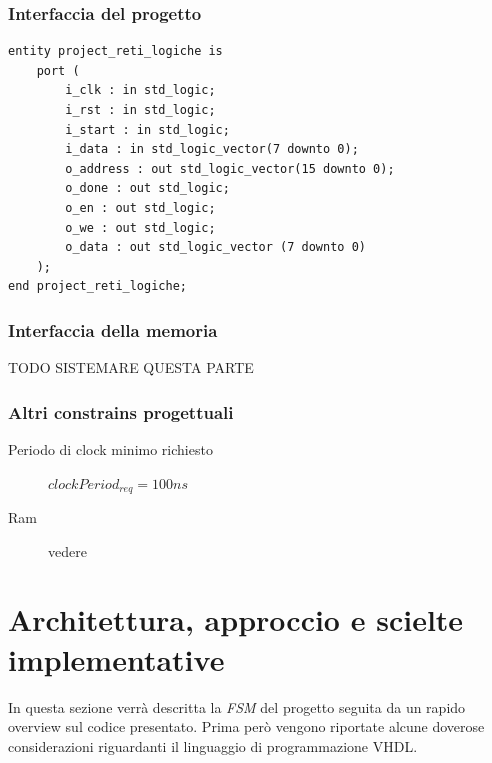 \documentclass[11pt,a4paper]{article}
\begin{document}
        \subsubsection{Interfaccia del progetto}
            \begin{verbatim}
entity project_reti_logiche is
    port (
        i_clk : in std_logic;
        i_rst : in std_logic;
        i_start : in std_logic;
        i_data : in std_logic_vector(7 downto 0);
        o_address : out std_logic_vector(15 downto 0);
        o_done : out std_logic;
        o_en : out std_logic;
        o_we : out std_logic;
        o_data : out std_logic_vector (7 downto 0)
    );
end project_reti_logiche;
            \end{verbatim}
        \subsubsection{Interfaccia della memoria}
        TODO SISTEMARE QUESTA PARTE
        \subsubsection{Altri constrains progettuali}
        \begin{description}
            \item[Periodo di clock minimo richiesto] $clockPeriod_{req} = 100ns$
            \item[Ram] vedere   
        \end{description}
    \section{Architettura, approccio e scielte implementative}
        In questa sezione verrà descritta la \textit{FSM} del progetto seguita da un rapido overview sul codice presentato. Prima però vengono riportate alcune doverose considerazioni
        riguardanti il linguaggio di programmazione VHDL.
\end{document}
